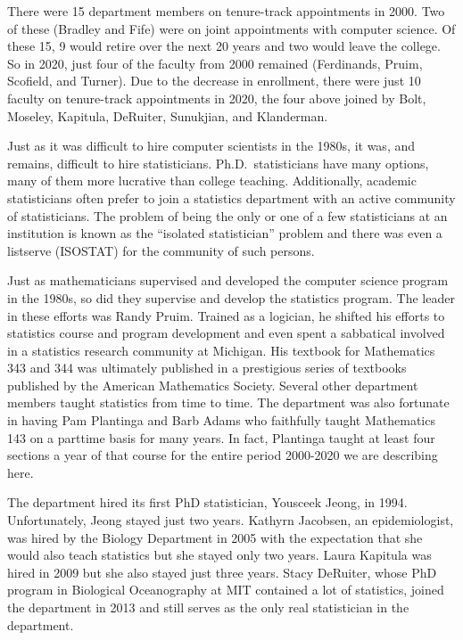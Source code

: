 \documentclass[
]{book}
\begin{document}
There were 15 department members on tenure-track appointments in 2000. Two of these (Bradley and Fife) were on joint appointments with computer science. Of these 15, 9 would retire over the next 20 years and two would leave the college. So in 2020, just four of the faculty from 2000 remained (Ferdinands, Pruim, Scofield, and Turner). Due to the decrease in enrollment, there were just 10 faculty on tenure-track appointments in 2020, the four above joined by Bolt, Moseley, Kapitula, DeRuiter, Sunukjian, and Klanderman.

Just as it was difficult to hire computer scientists in the 1980s, it was, and remains, difficult to hire statisticians. Ph.D.~statisticians have many options, many of them more lucrative than college teaching. Additionally, academic statisticians often prefer to join a statistics department with an active community of statisticians. The problem of being the only or one of a few statisticians at an institution is known as the ``isolated statistician'' problem and there was even a listserve (ISOSTAT) for the community of such persons.

Just as mathematicians supervised and developed the computer science program in the 1980s, so did they supervise and develop the statistics program. The leader in these efforts was Randy Pruim. Trained as a logician, he shifted his efforts to statistics course and program development and even spent a sabbatical involved in a statistics research community at Michigan. His textbook for Mathematics 343 and 344 was ultimately published in a prestigious series of textbooks published by the American Mathematics Society. Several other department members taught statistics from time to time. The department was also fortunate in having Pam Plantinga and Barb Adams who faithfully taught Mathematics 143 on a parttime basis for many years. In fact, Plantinga taught at least four sections a year of that course for the entire period 2000-2020 we are describing here.

The department hired its first PhD statistician, Yousceek Jeong, in 1994. Unfortunately, Jeong stayed just two years. Kathyrn Jacobsen, an epidemiologist, was hired by the Biology Department in 2005 with the expectation that she would also teach statistics but she stayed only two years. Laura Kapitula was hired in 2009 but she also stayed just three years. Stacy DeRuiter, whose PhD program in Biological Oceanography at MIT contained a lot of statistics, joined the department in 2013 and still serves as the only real statistician in the department.
\end{document}
